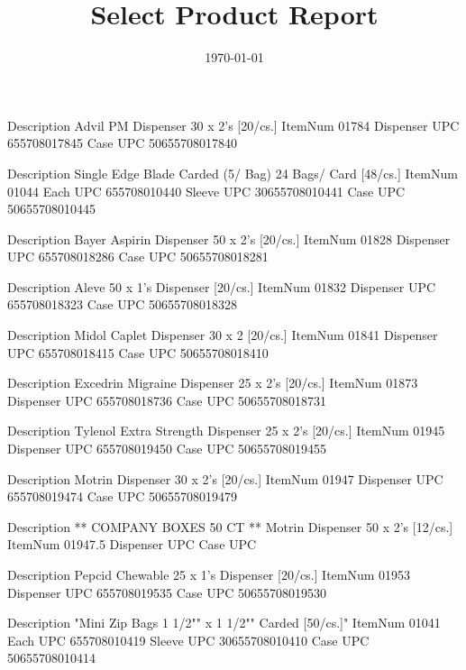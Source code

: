 \documentclass{article}
\title{Select Product Report}
\date{\today}
\begin{document}
\maketitle

Description		Advil PM Dispenser 30 x 2's [20/cs.]                        
ItemNum	  01784 
Dispenser UPC	   655708017845 
Case UPC	   50655708017840 

Description		Single Edge Blade Carded (5/ Bag) 24 Bags/ Card [48/cs.]    
ItemNum	          01044 
Each UPC  	   655708010440 
Sleeve UPC	   30655708010441 
Case UPC	   50655708010445 

Description		Bayer Aspirin Dispenser 50 x 2's [20/cs.]                   
ItemNum	  01828 
Dispenser UPC	   655708018286 
Case UPC	   50655708018281 

Description		Aleve 50 x 1's Dispenser [20/cs.]                           
ItemNum	  01832 
Dispenser UPC	   655708018323 
Case UPC	   50655708018328 

Description		Midol Caplet Dispenser 30 x 2 [20/cs.]                      
ItemNum	  01841 
Dispenser UPC	   655708018415 
Case UPC	   50655708018410 

Description		 Excedrin Migraine Dispenser 25 x 2's [20/cs.]              
ItemNum	  01873 
Dispenser UPC	   655708018736 
Case UPC	   50655708018731 

Description		 Tylenol Extra Strength Dispenser 25 x 2's [20/cs.]         
ItemNum	  01945 
Dispenser UPC	   655708019450 
Case UPC	   50655708019455 

Description		Motrin Dispenser 30 x 2's [20/cs.]                          
ItemNum	  01947 
Dispenser UPC	   655708019474 
Case UPC	   50655708019479 

Description		** COMPANY BOXES 50 CT ** Motrin Dispenser 50 x 2's [12/cs.]
ItemNum	  01947.5 
Dispenser UPC	    
Case UPC	    

Description		Pepcid Chewable 25 x 1's Dispenser [20/cs.]                 
ItemNum	  01953 
Dispenser UPC	   655708019535 
Case UPC	   50655708019530 

Description		"Mini Zip Bags 1 1/2"" x 1 1/2"" Carded [50/cs.]"
ItemNum	          01041 
Each UPC  	   655708010419 
Sleeve UPC	   30655708010410 
Case UPC	   50655708010414 
\end{document}
